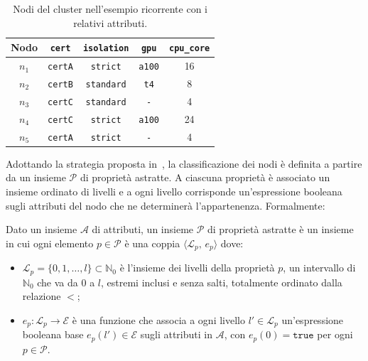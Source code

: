 \begin{table}[ht]
    \centering
    \begin{tabular}{ccccc}
        \toprule
        \textbf{Nodo} & \texttt{cert} & \texttt{isolation} & \texttt{gpu} & \texttt{cpu\_core} \\
        \midrule
        $n_1$ & \texttt{certA} & \texttt{strict}   & \texttt{a100} & 16 \\
        $n_2$ & \texttt{certB} & \texttt{standard} & \texttt{t4}   & 8  \\
        $n_3$ & \texttt{certC} & \texttt{standard} & \texttt{-}    & 4  \\
        $n_4$ & \texttt{certC} & \texttt{strict}   & \texttt{a100} & 24 \\
        $n_5$ & \texttt{certA} & \texttt{strict}   & \texttt{-}    & 4  \\
        \bottomrule
    \end{tabular}
    \caption{Nodi del cluster nell'esempio ricorrente con i relativi attributi.}
    \label{tab:attributi_nodi}
\end{table}

Adottando la strategia proposta in~\cite{sec-aware-data-alloc-multicloud}, la classificazione dei nodi è definita a partire da un insieme $\mathcal{P}$ di proprietà astratte. A ciascuna proprietà è associato un insieme ordinato di livelli e a ogni livello corrisponde un'espressione booleana sugli attributi del nodo che ne determinerà l'appartenenza. Formalmente:

\begin{definition}
\label{def:proprieta_astratta}
    Dato un insieme $\mathcal{A}$ di attributi, un insieme $\mathcal{P}$ di proprietà astratte è un insieme in cui ogni elemento $p \in \mathcal{P}$ è una coppia $\langle \mathcal{L}_p,\, e_p \rangle$ dove:
    \begin{itemize}
        \item $\mathcal{L}_p = \{0,1,\ldots,l\} \subset \mathbb{N}_0$ è l'insieme dei livelli della proprietà $p$, un intervallo di $\mathbb{N}_0$ che va da $0$ a $l$, estremi inclusi e senza salti, totalmente ordinato dalla relazione $<$;
        \item $e_p : \mathcal{L}_p \rightarrow \mathcal{E}$ è una funzione che associa a ogni livello $l' \in \mathcal{L}_p$ un'espressione booleana base $e_p(l') \in \mathcal{E}$ sugli attributi in $\mathcal{A}$, con $e_p(0) = \mathtt{true}$ per ogni $p \in \mathcal{P}$.
    \end{itemize}
\end{definition}

